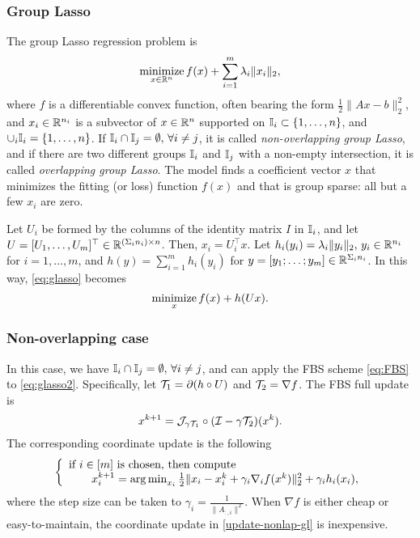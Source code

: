 \subsubsection{Group Lasso}\label{sec:glasso}
The group Lasso regression problem \cite{YL2006GrpLasso} is 
\begin{equation}\label{eq:glasso}
\Min_{x\in\RR^n}  f(x)+\sum_{i=1}^m\lambda_i\|x_i\|_2,
\end{equation} 
where $ f$ is a differentiable convex function, often bearing the form $\frac{1}{2}\|Ax-b\|_2^2$, and $x_i\in \mathbb{R}^{n_i}$ is a subvector of $x\in\mathbb{R}^n$ supported on $\mathbb{I}_i\subset \{1,\dots,n\}$, and $\cup_i \mathbb{I}_i=\{1,\dots,n\}$. If $\mathbb{I}_i\cap \mathbb{I}_j =\emptyset, \,\forall i\neq j$, it is called \emph{non-overlapping group Lasso}, and if there are two different groups $\mathbb{I}_i$ and $\mathbb{I}_j$ with a non-empty intersection, it is called \emph{overlapping group Lasso}. The model finds a coefficient vector $x$ that minimizes the fitting (or loss) function $f(x)$ and that is group sparse: all but a few $x_i$ are zero.  

Let $U_i$ be formed by the columns of the identity matrix $I$ in $\mathbb{I}_i$, and let $U=[U_1,\ldots,U_m]^\top\in\mathbb{R}^{(\Sigma_i n_i)\times n}$. Then, $x_i=U_i^\top x$. Let $h_i(y_i)=\lambda_i\|y_i\|_2,\,y_i\in\mathbb{R}^{n_i}$ for $i=1,\ldots,m$, and $h(y)=\sum_{i=1}^m h_i(y_i)$ for $y=[y_1;\ldots;y_m]\in\mathbb{R}^{\Sigma_i n_i}$. In this way, \eqref{eq:glasso} becomes
\begin{equation}\label{eq:glasso2}
\Min_x f(x)+h(Ux).
\end{equation}

\subsubsection*{Non-overlapping case~\cite{YL2006GrpLasso}} In this case, we have $\mathbb{I}_i\cap \mathbb{I}_j =\emptyset, \,\forall i\neq j$, and can apply the FBS scheme \eqref{eq:FBS} to \eqref{eq:glasso2}. Specifically, let ${\mathcal{T}}_1=\partial (h\circ U)$ and ${\mathcal{T}}_2=\nabla f$. The FBS full update is 
$$x^{k+1}={\mathcal{J}}_{\gamma {\mathcal{T}}_1}\circ({\mathcal{I}}-\gamma{\mathcal{T}}_2)(x^k).$$
The corresponding coordinate update is the following
\begin{equation}\label{update-nonlap-gl}
{\left\{
\begin{array}{l}
\text{if }i \in [m]\text{ is chosen, then compute}\\
\qquad x_i^{k+1}=\argmin_{x_i}\frac{1}{2}\|x_i-x_i^k+\gamma_i \nabla_i f(x^k)\|_2^2+ \gamma_i h_i(x_i),\\
\end{array}
\right.
}\end{equation}
where the step size can be taken to $\gamma_i=\frac{1}{\|A_{:,i}\|^2}$. When $\nabla f$ is either cheap or easy-to-maintain,  the coordinate update in \eqref{update-nonlap-gl} is inexpensive.

